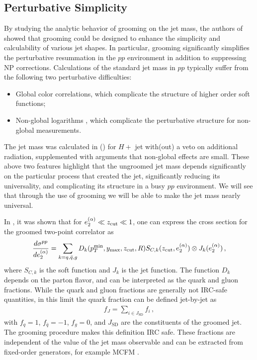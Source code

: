 \subsection{Perturbative Simplicity}
\label{sec:pertsimplicity}

By studying the analytic behavior of grooming on the jet mass, the authors of  showed that grooming could be designed to enhance the simplicity and calculability of various jet shapes.
%
In particular, grooming significantly simplifies the perturbative resummation in the $pp$ environment in addition to suppressing NP corrections.
%
Calculations of the standard jet mass in $pp$ typically suffer from the following two perturbative difficulties:
%
\begin{itemize}
%
\item Global color correlations, which complicate the structure of higher order soft functions;
%
\item Non-global logarithms \cite{Dasgupta:2001sh}, which complicate the perturbative structure for non-global measurements.
%
\end{itemize}
%
The jet mass was calculated in \cite{Jouttenus:2013hs} (\cite{arXiv:1207.1640}) for $H+$ jet with(out) a veto on additional radiation, supplemented with arguments that non-global effects are small.
%
These above two features highlight that the ungroomed jet mass depends significantly on the particular process that created the jet, significantly reducing its universality, and complicating its structure in a busy $pp$ environment.
%
We will see that through the use of grooming we will be able to make the jet mass nearly universal.

In , it was shown that for $e_{2}^{(\alpha)} \ll z_{\rm cut} \ll 1$, one can express the cross section for the groomed two-point correlator as
%
\begin{align}
\label{eq:fac_pp_e2}
\frac{d\sigma^{pp}}{de_{2}^{(\alpha)}}=\sum\limits_{k=q,\bar q, g}D_k(p_T^{\text{min}}, y_\text{max}, z_{\rm cut}, R) S_{C,k}(z_{\rm cut}, e_{2}^{(\alpha)})\otimes J_k (e_{2}^{(\alpha)})\,,
\end{align}
%
where $S_{C,k}$ is the soft function and $J_k$ is the jet function.
%
The function $D_k$ depends on the parton flavor, and can be interpreted as the quark and gluon fractions.
%
While the quark and gluon fractions are generally not IRC-safe quantities, in this limit the quark fraction can be defined jet-by-jet as 
\begin{align}
f_J=\sum\limits_{i\in J_{\text{SD}}} f_i\,,
\end{align}
with $f_q=1$, $f_{\bar q}=-1$, $f_g=0$, and $J_{\text{SD}}$ are the constituents of the groomed jet.
%
The grooming procedure makes this definition IRC safe.
%
These fractions are independent of the value of the jet mass observable and can be extracted from fixed-order generators, for example MCFM \cite{Campbell:1999ah,Campbell:2010ff,Campbell:2011bn}.

